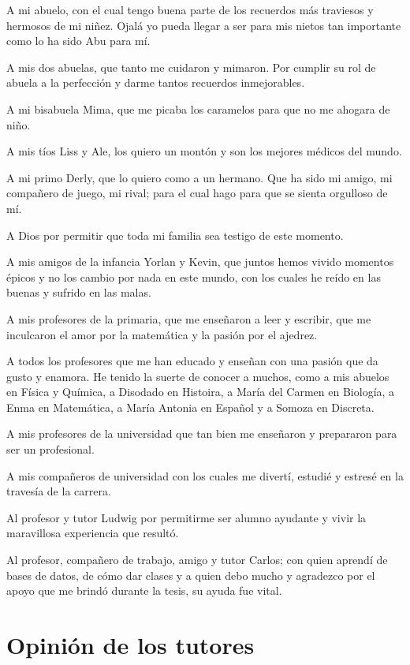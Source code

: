 \documentclass[a4paper,openright,11pt,oneside]{book}
\begin{document}
	A mi abuelo, con el cual tengo buena parte de los recuerdos más traviesos y hermosos de mi niñez. Ojalá yo pueda llegar a ser para mis nietos tan importante como lo ha sido Abu para mí.
	
	A mis dos abuelas, que tanto me cuidaron y mimaron. Por cumplir su rol de abuela a la perfección y darme tantos recuerdos inmejorables.
	
	A mi bisabuela Mima, que me picaba los caramelos para que no me ahogara de niño.
	
	A mis tíos Liss y Ale, los quiero un montón y son los mejores médicos del mundo.
	
	A mi primo Derly, que lo quiero como a un hermano. Que ha sido mi amigo, mi compañero de juego, mi rival; para el cual hago para que se sienta orgulloso de mí.
	
	A Dios por permitir que toda mi familia sea testigo de este momento.
	
	A mis amigos de la infancia Yorlan y Kevin, que juntos hemos vivido momentos épicos y no los cambio por nada en este mundo, con los cuales he reído en las buenas y sufrido en las malas.
	
	A mis profesores de la primaria, que me enseñaron a leer y escribir, que me inculcaron el amor por la matemática y la pasión por el ajedrez.
	
	A todos los profesores que me han educado y enseñan con una pasión que da gusto y enamora. He tenido la suerte de conocer a muchos, como a mis abuelos en Física y Química, a Disodado en Histoira, a María del Carmen en Biología, a Enma en Matemática, a María Antonia en Español y a Somoza en Discreta.
	
	A mis profesores de la universidad que tan bien me enseñaron y prepararon para ser un profesional.
	
	A mis compañeros de universidad con los cuales me divertí, estudié y estresé en la travesía de la carrera. 
	
	Al profesor y tutor Ludwig por permitirme ser alumno ayudante y vivir la maravillosa experiencia que resultó.
	
	Al profesor, compañero de trabajo, amigo y tutor Carlos; con quien aprendí de bases de datos, de cómo dar clases y a quien debo mucho y agradezco por el apoyo que me brindó durante la tesis, su ayuda fue vital.


\chapter*{Opinión de los tutores}\label{chapter:supervisor_opinion}
	
\end{document}
